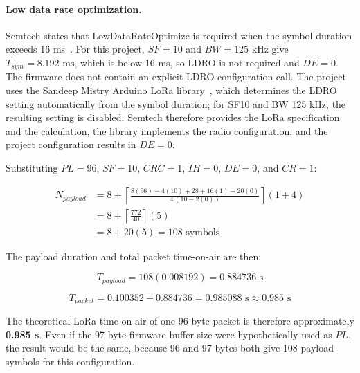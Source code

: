 \paragraph{Low data rate optimization.}
Semtech states that LowDataRateOptimize is required when the symbol duration exceeds 16 ms~\cite[Secs.~4.1.1.5--4.1.1.7, pp.~28--31]{semtech2020sx1276}. For this project, \(SF = 10\) and \(BW = 125\text{ kHz}\) give \(T_{sym} = 8.192\text{ ms}\), which is below 16 ms, so LDRO is not required and \(DE = 0\). The firmware does not contain an explicit LDRO configuration call. The project uses the Sandeep Mistry Arduino LoRa library~\cite{mistry_arduinolora}, which determines the LDRO setting automatically from the symbol duration; for SF10 and BW 125 kHz, the resulting setting is disabled. Semtech therefore provides the LoRa specification and the calculation, the library implements the radio configuration, and the project configuration results in \(DE = 0\).

Substituting \(PL = 96\), \(SF = 10\), \(CRC = 1\), \(IH = 0\), \(DE = 0\), and \(CR = 1\):

\begin{equation}
\begin{aligned}
N_{payload} &= 8 + \left\lceil \frac{8(96) - 4(10) + 28 + 16(1) - 20(0)}{4\,(10 - 2(0))} \right\rceil (1 + 4) \\
&= 8 + \left\lceil \frac{772}{40} \right\rceil (5) \\
&= 8 + 20(5) = 108\text{ symbols}
\end{aligned}
\label{eq:payload-symbols-value}
\end{equation}

The payload duration and total packet time-on-air are then:

\begin{equation}
T_{payload} = 108(0.008192) = 0.884736\text{ s}
\label{eq:payload-duration}
\end{equation}

\begin{equation}
T_{packet} = 0.100352 + 0.884736 = 0.985088\text{ s} \approx 0.985\text{ s}
\label{eq:total-packet-airtime}
\end{equation}

The theoretical LoRa time-on-air of one 96-byte packet is therefore approximately \textbf{0.985 s}. Even if the 97-byte firmware buffer size were hypothetically used as \(PL\), the result would be the same, because 96 and 97 bytes both give 108 payload symbols for this configuration.

